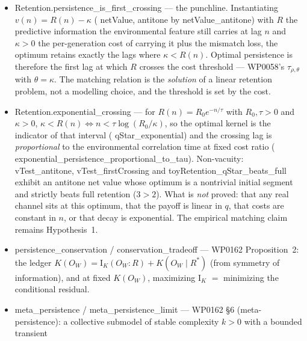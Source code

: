 \documentclass[11pt,a4paper]{article}
\newcommand{\lean}[1]{{\ttfamily\small
  \let\leanunderscore\_\def\_{\leanunderscore\allowbreak}#1}}
\newcommand{\Ik}{\mathrm{I}_K}
\begin{document}
\begin{itemize}[leftmargin=1.4em,itemsep=1pt]
\lean{qStar\_of\_nonpos}, \lean{qStar\_admissible}). If $v$ is antitone the retained set is an
initial segment (\lean{optimal\_kernel\_antitone\_is\_initial\_segment}), so the optimum is
``retain for $L$ generations, then drop'', and $L$ is the \emph{first crossing}:
$q^\ast(n)=1 \iff n<L$ (\lean{qStar\_eq\_one\_iff\_lt\_first\_crossing},
\lean{qStar\_eq\_zero\_of\_first\_crossing\_le}) for $L$ satisfying \lean{FirstCrossing}, which
exists whenever $v$ is somewhere nonpositive (\lean{exists\_firstCrossing}).
\item \lean{Retention.persistence\_is\_first\_crossing} --- the punchline. Instantiating
$v(n)=R(n)-\kappa$ (\lean{netValue}, antitone by \lean{netValue\_antitone}) with $R$ the predictive
information the environmental feature still carries at lag $n$ and $\kappa>0$ the per-generation cost
of carrying it plus the mismatch loss, the optimum retains exactly the lags where $\kappa<R(n)$.
Optimal persistence is therefore the first lag at which $R$ crosses the cost threshold --- WP0058's
$\tau_{\rho,\theta}$ with $\theta=\kappa$. The matching relation is the \emph{solution} of a linear
retention problem, not a modelling choice, and the threshold is set by the cost.
\item \lean{Retention.exponential\_crossing} --- for $R(n)=R_0e^{-n/\tau}$ with $R_0,\tau>0$ and
$\kappa>0$, $\kappa<R(n) \iff n < \tau\log(R_0/\kappa)$, so the optimal kernel is the indicator of
that interval (\lean{qStar\_exponential}) and the crossing lag is \emph{proportional} to the
environmental correlation time at fixed cost ratio
(\lean{exponential\_persistence\_proportional\_to\_tau}). Non-vacuity: \lean{vTest\_antitone},
\lean{vTest\_firstCrossing} and \lean{toyRetention\_qStar\_beats\_full} exhibit an antitone net value
whose optimum is a nontrivial initial segment and strictly beats full retention ($3>2$).
What is \emph{not} proved: that any real channel sits at this optimum, that the payoff is linear in
$q$, that costs are constant in $n$, or that decay is exponential. The empirical matching claim
remains Hypothesis~1.
\item \lean{persistence\_conservation} / \lean{conservation\_tradeoff} --- WP0162 Proposition~2:
the ledger $K(O_W)=\Ik(O_W{:}R)+K(O_W\mid R^\ast)$ (from symmetry of information), and at fixed
$K(O_W)$, maximizing $\Ik$ $=$ minimizing the conditional residual.
\item \lean{meta\_persistence} / \lean{meta\_persistence\_limit} --- WP0162 \S6 (meta-persistence):
a collective submodel of stable complexity $k>0$ with a bounded transient

\end{itemize}
\end{document}
